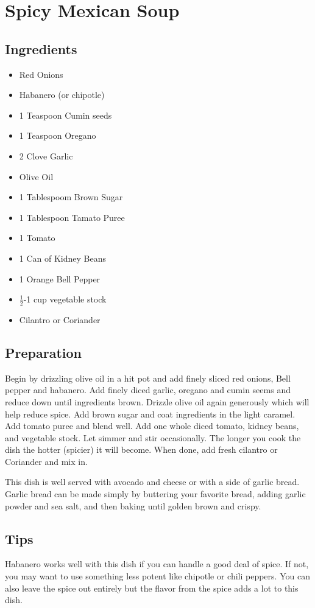 \thispagestyle{fancy}
\section{Spicy Mexican Soup}
\AddToShipoutPicture*{\MexicanSoup}

\subsection*{Ingredients}
\begin{multicols}{3}
	\begin{itemize}
		\item Red Onions
		\item Habanero (or chipotle)
		\item 1 Teaspoon Cumin seeds
		\item 1 Teaspoon Oregano
		\item 2 Clove Garlic
		\item Olive Oil
		\item 1 Tablespoom Brown Sugar
		\item 1 Tablespoon Tamato Puree
		\item 1 Tomato
		\item 1 Can of Kidney Beans
		\item 1 Orange Bell Pepper
		\item $\frac{1}{2}$-1 cup vegetable stock
		\item Cilantro or Coriander
	\end{itemize}
\end{multicols}

\subsection*{Preparation}

Begin by drizzling olive oil in a hit pot and add finely sliced red onions, Bell pepper and habanero. Add finely diced garlic, oregano and cumin seems and reduce down until ingredients brown. Drizzle olive oil again generously which will help reduce spice. Add brown sugar and coat ingredients in the light caramel. Add tomato puree and blend well. Add one whole diced tomato, kidney beans, and vegetable stock. Let simmer and stir occasionally. The longer you cook the dish the hotter (spicier) it will become. When done, add fresh cilantro or Coriander and mix in. 

This dish is well served with avocado and cheese or with a side of garlic bread. Garlic bread can be made simply by buttering your favorite bread, adding garlic powder and sea salt, and then baking until golden brown and crispy. 

\subsection*{Tips}

Habanero works well with this dish if you can handle a good deal of spice. If not, you may want to use something less potent like chipotle or chili peppers. You can also leave the spice out entirely but the flavor from the spice adds a lot to this dish.